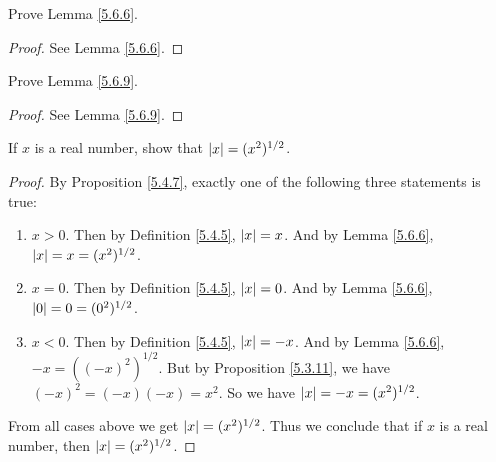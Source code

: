 \exercisesection

\begin{exercise}\label{ex 5.6.1}
    Prove Lemma \ref{5.6.6}.
\end{exercise}

\begin{proof}
    See Lemma \ref{5.6.6}.
\end{proof}

\begin{exercise}\label{ex 5.6.2}
    Prove Lemma \ref{5.6.9}.
\end{exercise}

\begin{proof}
    See Lemma \ref{5.6.9}.
\end{proof}

\begin{exercise}\label{ex 5.6.3}
    If \(x\) is a real number, show that \(\abs*{x} = (x^2)^{1 / 2}\).
\end{exercise}

\begin{proof}
    By Proposition \ref{5.4.7}, exactly one of the following three statements is true:
    \begin{enumerate}
        \item \(x > 0\).
              Then by Definition \ref{5.4.5}, \(\abs*{x} = x\).
              And by Lemma \ref{5.6.6}, \(\abs*{x} = x = (x^2)^{1 / 2}\).
        \item \(x = 0\).
              Then by Definition \ref{5.4.5}, \(\abs*{x} = 0\).
              And by Lemma \ref{5.6.6}, \(\abs*{0} = 0 = (0^2)^{1 / 2}\).
        \item \(x < 0\).
              Then by Definition \ref{5.4.5}, \(\abs*{x} = -x\).
              And by Lemma \ref{5.6.6}, \(-x = ((-x)^2)^{1 / 2}\).
              But by Proposition \ref{5.3.11}, we have \((-x)^2 = (-x)(-x) = x^2\).
              So we have \(\abs*{x} = -x = (x^2)^{1 / 2}\).
    \end{enumerate}
    From all cases above we get \(\abs*{x} = (x^2)^{1 / 2}\).
    Thus we conclude that if \(x\) is a real number, then \(\abs*{x} = (x^2)^{1 / 2}\).
\end{proof}